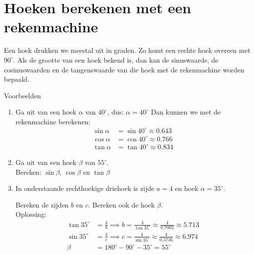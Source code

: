 \section{Hoeken berekenen met een rekenmachine}
Een hoek drukken we meestal uit in graden. Zo komt een rechte hoek overeen met $90^{\circ}$. Als de grootte van een hoek bekend is, dan kan de sinuswaarde, de cosinuswaarden en de tangenswaarde van die hoek met de rekenmachine worden bepaald.

Voorbeelden
\begin{enumerate}
    \itemsep1em
    \item Ga uit van een hoek $\alpha$ van $40^{\circ}$, dus: $\alpha=40^{\circ}$
          Dan kunnen we met de rekenmachine berekenen: 
          \begin{align*}
            \sin\alpha &=\sin 40^{\circ} \approx 0.643 \\
            \cos\alpha &=\cos⁡ 40^{\circ} \approx 0.766 \\
            \tan\alpha &=\tan⁡ 40^{\circ} \approx 0.834
          \end{align*}
          
    \item Ga uit van een hoek $\beta$ van $55^{\circ}$. \\
          Bereken: $\sin⁡\beta$, $\cos\beta⁡$ en $\tan\beta $
          
    \item In onderstaande rechthoekige driehoek is zijde $a=4$ en hoek $\alpha=35^{\circ}$. \\
          \begin{center}
          \end{center}
          Bereken de zijden $b$ en $c$. Bereken ook de hoek $\beta$. \\

          Oplossing:
          \begin{align*}
          \tan 35^\circ &= \frac{4}{b} \implies b = \frac{4}{\tan 35^\circ} \approx \frac{4}{0.7002} \approx 5.713 \\[0.5em]
          \sin 35^\circ &= \frac{4}{c} \implies c = \frac{4}{\sin 35^\circ} \approx \frac{4}{0.5736} \approx 6.974 \\[0.5em]
          \beta &= 180^\circ - 90^\circ - 35^\circ = 55^\circ
          \end{align*}


\end{enumerate}
